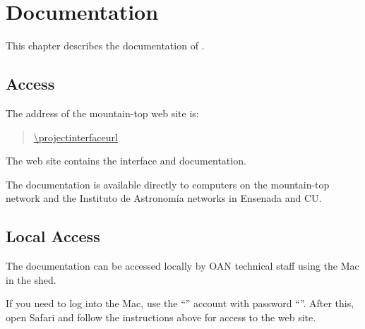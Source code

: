 \chapter{Documentation}
\label{chapter:documentation}

This chapter describes the documentation of {\projectname}.

\section{Access}

The address of the {\projectname} mountain-top web site is:
\begin{quotation}
\url{\projectinterfaceurl}
\end{quotation}

The web site contains the interface and documentation.

The documentation is available directly to computers on the mountain-top network and the Instituto de Astronomía networks in Ensenada and CU.

\section{Local Access}
\label{section:documentation-local-access}

The documentation can be accessed locally by OAN technical staff using the Mac in the shed.

If you need to log into the Mac, use the “{\projectaccount}” account with password “{\projectaccount}”. After this, open Safari and follow the instructions above for access to the web site.

